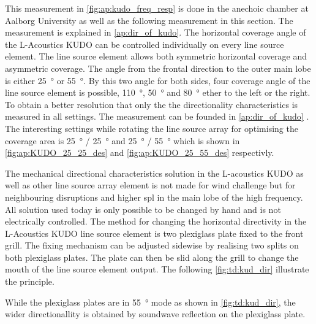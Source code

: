 This measurement in \autoref{fig:ap:kudo_freq_resp} is done in the anechoic chamber at Aalborg University as well as the following measurement in this section. The measurement is explained in \autoref{ap:dir_of_kudo}. The horizontal coverage angle of the L-Acoustics KUDO can be controlled individually on every line source element. The line source element allows both symmetric horizontal coverage and asymmetric coverage. The angle from the frontal direction to the outer main lobe  is either \SI{25}{\degree} or \SI{55}{\degree}. By this two angle for both sides, four coverage angle of the line source element is possible, \SI{110}{\degree}, \SI{50}{\degree} and \SI{80}{\degree} ether to the left or the right. To obtain a better resolution that only the  the directionality characteristics is measured in all settings. The measurement can be founded in \autoref{ap:dir_of_kudo} . The interesting settings while rotating the line source array for optimising the coverage area is \SI{25}{\degree} / \SI{25}{\degree} and \SI{25}{\degree} / \SI{55}{\degree} which is shown in \autoref{fig:ap:KUDO_25_25_des} and \autoref{fig:ap:KUDO_25_55_des} respectivly.



The mechanical directional characteristics solution in the L-acoustics KUDO as well as other line source array element is not made for wind challenge but for neighbouring disruptions and higher \gls{spl} in the main lobe of the high frequency. All solution used today is only possible to be changed by hand and is not electrically controlled. The method for changing the horizontal directivity in the L-Acoustics KUDO line source element is two plexiglass plate fixed to the front grill. The fixing mechanism can be adjusted sidewise by realising two splits on both plexiglass plates. The plate can then be slid along the grill to change the mouth of the line source element output. The following \autoref{fig:td:kud_dir} illustrate the principle.

While the plexiglass plates are in \SI{55}{\degree} mode as shown in \autoref{fig:td:kud_dir}, the wider directionallity is obtained by soundwave reflection on the plexiglass plate.

